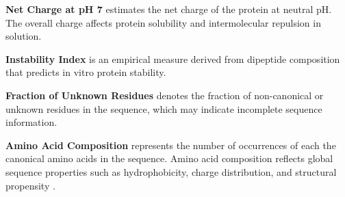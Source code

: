 \textbf{Net Charge at pH 7} estimates the net charge of the protein at neutral pH. The overall charge affects protein solubility and intermolecular repulsion in solution.

\textbf{Instability Index} is an empirical measure derived from dipeptide composition that predicts in vitro protein stability. 

\textbf{Fraction of Unknown Residues} denotes the fraction of non-canonical or unknown residues in the sequence, which may indicate incomplete sequence information.

\textbf{Amino Acid Composition} represents the number of occurrences of each the canonical amino acids in the sequence. Amino acid composition reflects global sequence properties such as hydrophobicity, charge distribution, and structural propensity \citep{PriceII2009}.